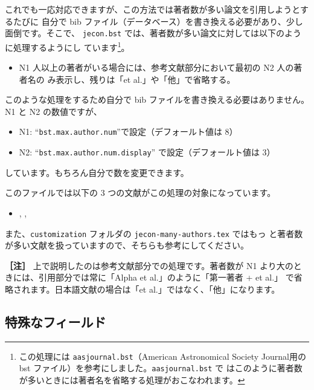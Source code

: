 \documentclass[a4j,10pt]{jarticle}
\begin{document}
これでも一応対応できますが、この方法では著者数が多い論文を引用しようとするたびに
自分で bib ファイル（データベース）を書き換える必要があり、少し面倒です。そこで、
\texttt{jecon.bst} では、著者数が多い論文に対しては以下のように処理するようにし
ています\footnote{この処理には \texttt{aasjournal.bst}（American Astronomical
Society Journal用の bst ファイル）を参考にしました。\texttt{aasjournal.bst} で
はこのように著者数が多いときには著者名を省略する処理がおこなわれます。}。
\begin{screen}
\begin{itemize}
 \item N1 人以上の著者がいる場合には、参考文献部分において最初の N2 人の著者名の
       み表示し、残りは「et al.」や「他」で省略する。
\end{itemize}
\end{screen}
このような処理をするため自分で bib ファイルを書き換える必要はありません。N1 と
N2 の数値ですが、
\begin{itemize}
 \item N1: ``\texttt{bst.max.author.num}''で設定（デフォールト値は 8）
 \item N2: ``\texttt{bst.max.author.num.display}'' で設定（デフォールト値は 3）
\end{itemize}
しています。もちろん自分で数を変更できます。

このファイルでは以下の 3 つの文献がこの処理の対象になっています。
\begin{itemize}
 \item \citet{doi:10.1175/2009BAMS2778.1}, \citet{doi:10.1175/2009BAMS2778.1}, \citet{Li_2018}
\end{itemize}

また、\texttt{customization} フォルダの \texttt{jecon-many-authors.tex} ではもっ
と著者数が多い文献を扱っていますので、そちらも参考にしてください。

\vspace*{1em}

\noindent \textbf{［注］} 上で説明したのは参考文献部分での処理です。著者数が N1
 より大のときには、引用部分では常に「Alpha et al.」のように「第一著者 + et al.」
 で省略されます。日本語文献の場合は「et al.」ではなく、「他」になります。

\vspace*{1em}


\subsection{特殊なフィールド}
\end{document}
